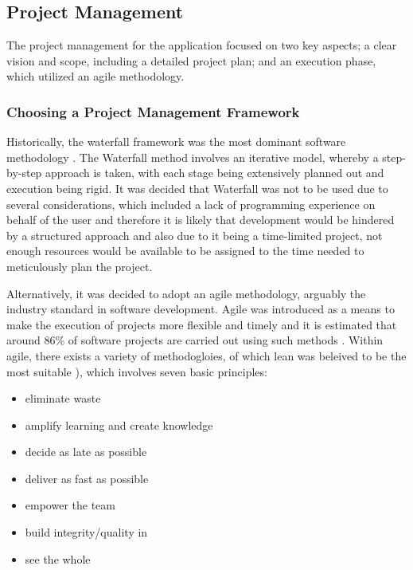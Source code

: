 \documentclass[12pt]{article}
\begin{document}
	\subsection{Project Management}

	The project management for the application focused on two key aspects; a clear vision and scope, including a detailed project plan; and an execution phase, which utilized an agile methodology.
	
	\subsubsection{Choosing a Project Management Framework}
	Historically, the waterfall framework was the most dominant software methodology \cite{AgileWaterfall2021}. The Waterfall method involves an iterative model, whereby a step-by-step approach is taken, with each stage being extensively planned out and execution being rigid. 
	It was decided that Waterfall was not to be used due to several considerations, which included a lack of programming experience on behalf of the user and therefore it is likely that development would be hindered by a structured approach and also due to it being a time-limited project, not enough resources would be available to be assigned to the time needed to meticulously plan the project.
	
	Alternatively, it was decided to adopt an agile methodology, arguably the industry standard in software development. Agile was introduced as a means to make the execution of projects more flexible and timely and it is estimated that around 86\% of software projects are carried out using such methods \cite{StateAgileReport2021}.
	Within agile, there exists a variety of methodogloies, of which lean was beleived to be the most suitable \cite{poppendieckLeanSoftwareDevelopment2003}), which involves seven basic principles:
	\begin{itemize}
		\item eliminate waste
		\item amplify learning and create knowledge
		\item decide as late as possible
		\item deliver as fast as possible
		\item empower the team
		\item build integrity/quality in
		\item see the whole
	\end{itemize}
	
	
	
\end{document}
